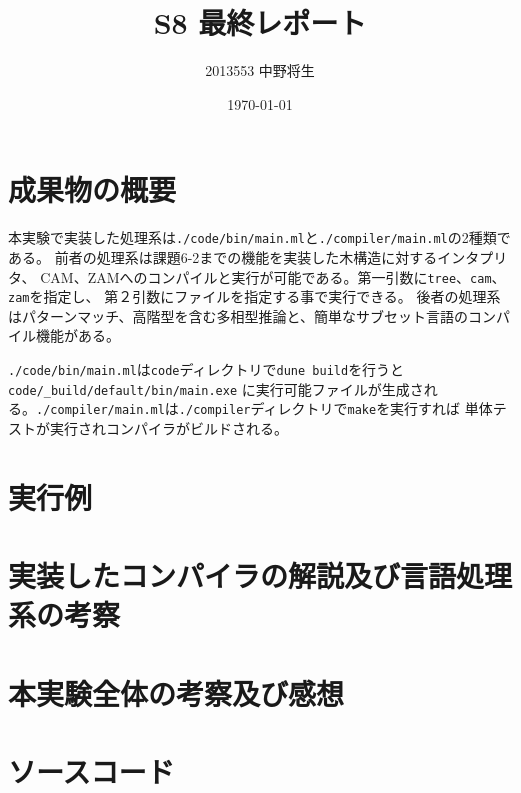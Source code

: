 \documentclass[report]{jlreq}
\author{2013553 中野将生}
\date{\today}
\title{S8 最終レポート}
\begin{document}
  \maketitle
  \chapter{成果物の概要}
    本実験で実装した処理系は\texttt{./code/bin/main.ml}と\texttt{./compiler/main.ml}の2種類である。
    前者の処理系は課題6-2までの機能を実装した木構造に対するインタプリタ、
    CAM、ZAMへのコンパイルと実行が可能である。第一引数に\texttt{tree}、\texttt{cam}、\texttt{zam}を指定し、
    第２引数にファイルを指定する事で実行できる。
    後者の処理系はパターンマッチ、高階型を含む多相型推論と、簡単なサブセット言語のコンパイル機能がある。

    \texttt{./code/bin/main.ml}は\texttt{code}ディレクトリで\texttt{dune build}を行うと\texttt{code/\_build/default/bin/main.exe}
    に実行可能ファイルが生成される。\texttt{./compiler/main.ml}は\texttt{./compiler}ディレクトリで\texttt{make}を実行すれば
    単体テストが実行されコンパイラがビルドされる。
  \chapter{実行例}
  \chapter{実装したコンパイラの解説及び言語処理系の考察}
  \chapter{本実験全体の考察及び感想}
  \chapter{ソースコード}
\end{document}
